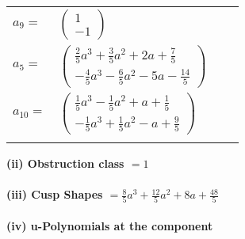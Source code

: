 \documentclass[1p]{elsarticle_modified}
\theoremstyle{definition}
\begin{document}
\begin{tabular}{m{7pt} m{180pt} m{7pt} m{180pt} }
\flushright $a_{9}=$&$\begin{pmatrix}1\\-1\end{pmatrix}$ \\
\flushright $a_{5}=$&$\begin{pmatrix}\frac{2}{5} a^3+\frac{3}{5} a^2+2 a+\frac{7}{5}\\-\frac{4}{5} a^3-\frac{6}{5} a^2-5 a-\frac{14}{5}\end{pmatrix}$ \\
\flushright $a_{10}=$&$\begin{pmatrix}\frac{1}{5} a^3-\frac{1}{5} a^2+a+\frac{1}{5}\\-\frac{1}{5} a^3+\frac{1}{5} a^2- a+\frac{9}{5}\end{pmatrix}$\\&\end{tabular}
\flushleft \textbf{(ii) Obstruction class $= 1$}\\~\\
\flushleft \textbf{(iii) Cusp Shapes $= \frac{8}{5} a^3+\frac{12}{5} a^2+8 a+\frac{48}{5}$}\\~\\
\newpage\renewcommand{\arraystretch}{1}
\flushleft \textbf{(iv) u-Polynomials at the component}\newline \\
\end{document}
